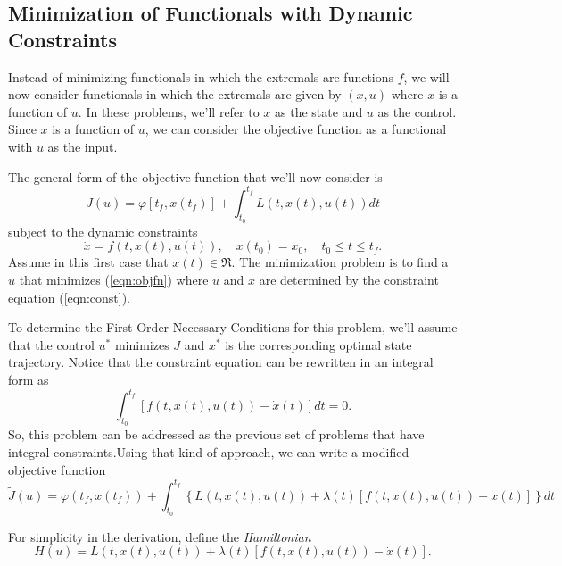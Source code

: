 

 
 \subsection{Minimization of Functionals with Dynamic Constraints}
 Instead of minimizing functionals in which the extremals are functions $f$, we will now consider functionals in which the extremals are given by $(x, u)$ where $x$ is a function of $u$. In these problems, we'll refer to $x$ as the state and $u$ as the control. Since $x$ is a function of $u$, we can consider the objective function as a functional with $u$ as the input.
 
 The general form of the objective function that we'll now consider is
 \begin{equation}\label{eqn:objfn}
 J(u) = \varphi[t_f,x(t_f)] + \int_{t_0}^{t_f}L(t,x(t),u(t))dt
 \end{equation}
 subject to the dynamic constraints
 \begin{equation}\label{eqn:const}
 \dot x = f(t,x(t),u(t)),\quad x(t_0) = x_0, \quad t_0\leq t\leq t_f.
 \end{equation}
 Assume in this first case that $x(t) \in \Re$.
 The minimization problem is to find a $u$ that minimizes (\ref{eqn:objfn}) where $u$ and $x$ are determined by the constraint equation (\ref{eqn:const}).
 
 To determine the First Order Necessary Conditions for this problem, we'll assume that the control $u^*$ minimizes $J$ and $x^*$ is the corresponding optimal state trajectory. 
 Notice that the constraint equation can be rewritten in an integral form as
 $$\int_{t_0}^{t_f}\left[f(t,x(t),u(t)) - \dot x(t)\right]dt = 0.$$
  So, this problem can be addressed as the previous set of problems that have integral constraints.Using that kind of approach, we can write a modified objective function
 $${\tilde J}(u) = \varphi(t_f,x(t_f)) + \int_{t_0}^{t_f}\left\{L(t,x(t),u(t)) + \lambda(t)[f(t,x(t),u(t)) - \dot x(t)]\right\}dt  $$
 
For simplicity in the derivation, define the {\it Hamiltonian}
 $$H(u) = L(t,x(t),u(t)) + \lambda(t)[f(t,x(t),u(t))-\dot x(t)].$$
 
